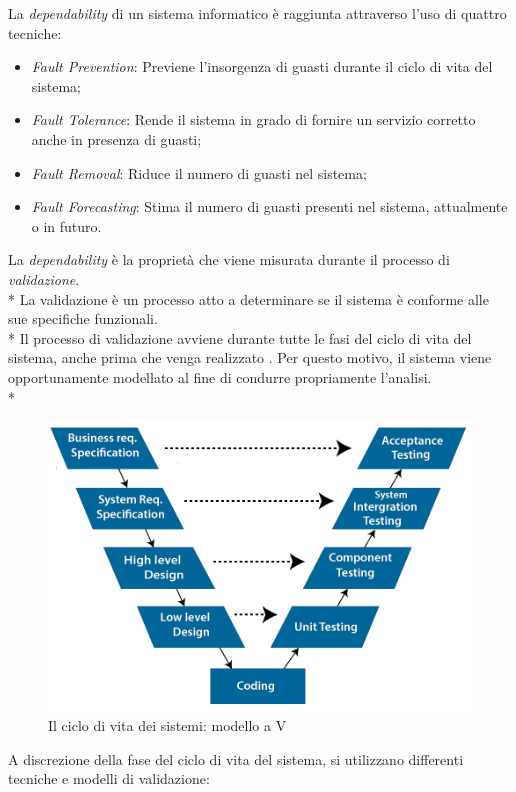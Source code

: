 La \emph{dependability} di un sistema informatico \`e raggiunta attraverso l'uso di quattro tecniche:
\begin{itemize}
	\item \emph{Fault Prevention}: Previene l'insorgenza di guasti durante il ciclo di vita del sistema;
	\item \emph{Fault Tolerance}: Rende il sistema in grado di fornire un servizio corretto anche in presenza di guasti;
	\item \emph{Fault Removal}: Riduce il numero di guasti nel sistema;
	\item \emph{Fault Forecasting}: Stima il numero di guasti presenti nel sistema, attualmente o in futuro.
\end{itemize}
La \emph{dependability} \`e la propriet\`a che viene misurata durante il processo di \emph{validazione}.\\*
La validazione \`e un processo atto a determinare se il sistema \`e conforme alle sue specifiche funzionali.\\*
Il processo di validazione avviene durante tutte le fasi del ciclo di vita del sistema, anche prima che venga realizzato \cite{50126}. Per questo motivo, il sistema viene opportunamente modellato al fine di condurre propriamente l'analisi.\\*
\begin{figure}[h]
	\centering
	\includegraphics[width=0.7\linewidth]{img/vmodel}
	\caption{Il ciclo di vita dei sistemi: modello a V}
	\label{fig:vmodel}
\end{figure}
\noindent{}A discrezione della fase del ciclo di vita del sistema, si utilizzano differenti tecniche e modelli di validazione: \cite{librobonda}

